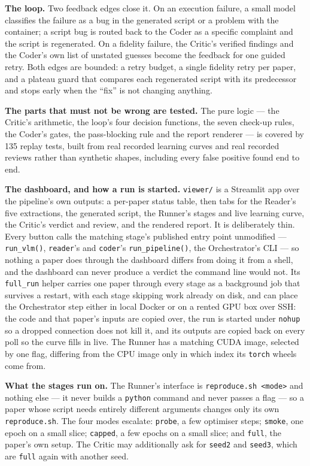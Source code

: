\documentclass[10pt,twocolumn]{article}
\begin{document}
\textbf{The loop.} Two feedback edges close it. On an execution failure, a small model classifies
the failure as a bug in the generated script or a problem with the container; a script bug is
routed back to the Coder as a specific complaint and the script is regenerated. On a fidelity
failure, the Critic's verified findings and the Coder's own list of unstated guesses become the
feedback for one guided retry. Both edges are bounded: a retry budget, a single fidelity retry
per paper, and a plateau guard that compares each regenerated script with its predecessor and
stops early when the ``fix'' is not changing anything.

\textbf{The parts that must not be wrong are tested.} The pure logic --- the Critic's arithmetic,
the loop's four decision functions, the seven check-up rules, the Coder's gates, the
pass-blocking rule and the report renderer --- is covered by 135 replay tests, built from real
recorded learning curves and real recorded reviews rather than synthetic shapes, including every
false positive found end to end.

\textbf{The dashboard, and how a run is started.} \texttt{viewer/} is a Streamlit app over the
pipeline's own outputs: a per-paper status table, then tabs for the Reader's five extractions,
the generated script, the Runner's stages and live learning curve, the Critic's verdict and
review, and the rendered report. It is deliberately thin. Every button calls the matching
stage's published entry point unmodified --- \texttt{run\_vlm()}, \texttt{reader}'s and
\texttt{coder}'s \texttt{run\_pipeline()}, the Orchestrator's CLI --- so nothing a paper does
through the dashboard differs from doing it from a shell, and the dashboard can never produce a
verdict the command line would not. Its \texttt{full\_run} helper carries one paper through
every stage as a background job that survives a restart, with each stage skipping work already
on disk, and can place the Orchestrator step either in local Docker or on a rented GPU box over
SSH: the code and that paper's inputs are copied over, the run is started under
\texttt{nohup} so a dropped connection does not kill it, and its outputs are copied back on
every poll so the curve fills in live. The Runner has a matching CUDA image, selected by one
flag, differing from the CPU image only in which index its \texttt{torch} wheels come from.

\textbf{What the stages run on.} The Runner's interface is \texttt{reproduce.sh <mode>} and
nothing else --- it never builds a \texttt{python} command and never passes a flag --- so a paper
whose script needs entirely different arguments changes only its own \texttt{reproduce.sh}. The
four modes escalate: \texttt{probe}, a few optimiser steps; \texttt{smoke}, one epoch on a small
slice; \texttt{capped}, a few epochs on a small slice; and \texttt{full}, the paper's own setup.
The Critic may additionally ask for \texttt{seed2} and \texttt{seed3}, which are \texttt{full}
again with another seed.
\end{document}
